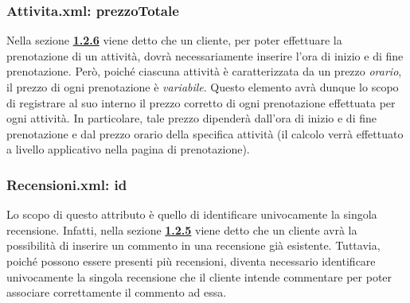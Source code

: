 \documentclass [a4paper, 12pt]{book}
\begin{document}
\subsubsection{Attivita.xml: prezzoTotale}
Nella sezione \hyperref[Attività]{\textbf{1.2.6}} viene detto che un cliente, per poter effettuare la prenotazione di un attività, dovrà necessariamente inserire l'ora di inizio e di fine prenotazione. Però, poiché ciascuna attività è caratterizzata da un prezzo \textit{orario}, il prezzo di ogni prenotazione è \textit{variabile}. Questo elemento avrà dunque lo scopo di registrare al suo interno il prezzo corretto di ogni prenotazione effettuata per ogni attività. In particolare, tale prezzo dipenderà dall'ora di inizio e di fine prenotazione e dal prezzo orario della specifica attività (il calcolo verrà effettuato a livello applicativo nella pagina di prenotazione).

\subsubsection{Recensioni.xml: id}
Lo scopo di questo attributo è quello di identificare univocamente la singola recensione. Infatti, nella sezione \hyperref[Recensioni]{\textbf{1.2.5}} viene detto che un cliente avrà la possibilità di inserire un commento in una recensione già esistente. Tuttavia, poiché possono essere presenti più recensioni, diventa necessario identificare univocamente la singola recensione che il cliente intende commentare per poter associare correttamente il commento ad essa.
\end{document}
